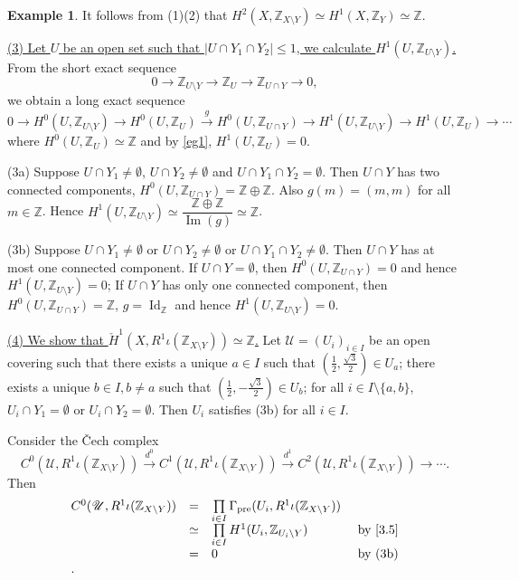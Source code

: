 \documentclass{amsart}
\numberwithin{equation}{section}
\theoremstyle{plain}
\theoremstyle{definition}
\newtheorem{eg}[equation]{Example}
\DeclareMathOperator{\Id}{Id}
\DeclareMathOperator{\Pre}{pre}
\DeclareMathOperator{\im}{Im}
\begin{document}
\begin{eg}
	It follows from (1)(2) that $ H^2(X, \mathbb Z_{X\setminus Y})\simeq H^1(X, \mathbb Z_Y)\simeq\mathbb Z $. 
	
	\underline{(3) Let $ U $ be an open set such that $ |U\cap Y_1\cap Y_2|\le 1 $, we calculate $ H^1(U, \mathbb Z_{U\setminus Y}) $. }
	From the short exact sequence
	\[0\to \mathbb Z_{U\setminus Y}\to \mathbb Z_U\to \mathbb Z_{U\cap Y}\to 0,\]
	we obtain a long exact sequence 
	\[
	0\to H^0(U, \mathbb Z_{U\setminus Y})\to H^0(U, \mathbb Z_{U})\xrightarrow{g} H^0(U, \mathbb Z_{U\cap Y})\to H^1(U, \mathbb Z_{U\setminus Y})\to H^1(U, \mathbb Z_{U})\to \cdots
	\]
	where $ H^0(U, \mathbb Z_U)\simeq \mathbb Z $ and by \cref{eg1}, $ H^1(U, \mathbb Z_U)= 0 $. 
	
	(3a) Suppose $ U\cap Y_1\ne\emptyset $, $ U\cap Y_2\ne\emptyset $ and $ U\cap Y_1\cap Y_2=\emptyset $. 
	Then $ U\cap Y $ has two connected components, $ H^0(U, \mathbb Z_{U\cap Y})=\mathbb Z\oplus\mathbb Z $. 
	Also $ g(m)=(m,m) $ for all $ m\in \mathbb Z $. Hence $ H^1(U, \mathbb Z_{U\setminus Y})\simeq \dfrac{\mathbb Z\oplus\mathbb Z}{\im(g)}\simeq\mathbb Z $. 
	
	(3b) Suppose $ U\cap Y_1\ne\emptyset $ or $ U\cap Y_2\ne\emptyset $ or $ U\cap Y_1\cap Y_2\ne\emptyset $. Then $ U\cap Y $ has at most one connected component. If $ U\cap Y=\emptyset $, then $ H^0(U, \mathbb Z_{U\cap Y})=0$ and hence $ H^1(U, \mathbb Z_{U\setminus Y})=0 $; If $ U\cap Y$ has only one connected component, then $ H^0(U, \mathbb Z_{U\cap Y})=\mathbb Z$, $ g=\Id_{\mathbb Z} $ and hence $ H^1(U, \mathbb Z_{U\setminus Y})=0 $.  
	
	\underline{(4) We show that $ \check{H}^1(X, R^1\iota(\mathbb Z_{X\setminus Y}))\simeq \mathbb Z $.} 
	Let $ \mathscr U=(U_i)_{i\in I} $ be an open covering such that 
	there exists a unique $ a\in I $ such that $ (\frac{1}{2},\frac{\sqrt{3}}{2})\in U_a $; there exists a unique $ b\in I, b\ne a $ such that $ (\frac{1}{2},-\frac{\sqrt{3}}{2})\in U_b $; 
	for all $ i\in I\setminus\{a,b\} $, $ U_i\cap Y_1=\emptyset $ or $ U_i\cap Y_2=\emptyset $. Then $ U_i$ satisfies (3b) for all $ i\in I $. 
	
	Consider the \v{C}ech complex
	\[C^0(\mathscr U, R^1\iota(\mathbb Z_{X\setminus Y}))\xrightarrow{d^0} C^1(\mathscr U, R^1\iota(\mathbb Z_{X\setminus Y}))\xrightarrow{d^1} C^2(\mathscr U, R^1\iota(\mathbb Z_{X\setminus Y}))\to\cdots.\]
	Then $$ 
	\begin{array}{llll}
	C^0(\mathscr U, R^1\iota(\mathbb Z_{X\setminus Y}))&=&\prod\limits_{i\in I}\Gamma_{\Pre}(U_i, R^1\iota(\mathbb Z_{X\setminus Y}))&\\
	&\simeq &\prod\limits_{i\in I}H^1(U_i, \mathbb Z_{U_i\setminus Y})&\text{ by \cref{3.5}}\\
	&=&0 &\text{ by (3b)}\\.
	\end{array}
	$$
	

\end{eg}
\end{document}
